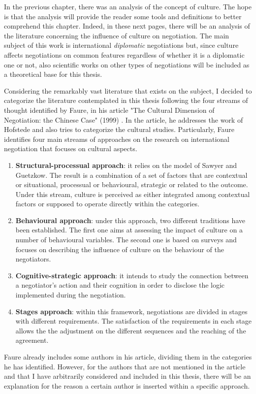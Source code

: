 \documentclass[../main.tex]{subfiles}
\begin{document}
In the previous chapter, there was an analysis of the concept of culture. The hope is that the analysis will provide the reader some tools and definitions to better comprehend this chapter. Indeed, in these next pages, there will be an analysis of the literature concerning the influence of culture on negotiation. The main subject of this work is international \textit{diplomatic} negotiations but, since culture affects negotiations on common features regardless of whether it is a diplomatic one or not, also scientific works on other types of negotiations will be included as a theoretical base for this thesis.%

Considering the remarkably vast literature that exists on the subject, I decided to categorize the literature contemplated %
in this thesis following the four streams of thought identified by Faure, in his article "The Cultural Dimension of Negotiation: the Chinese Case" (1999) \cite{faure}. In the article, he addresses the work of Hofstede and also tries to categorize the cultural studies. Particularly, Faure identifies four main streams of approaches on the research on international negotiation that focuses on cultural aspects.
\begin{enumerate}
\item \textbf{Structural-processual approach}: it relies on the model of Sawyer and Guetzkow. The result is a combination of a set of factors that are contextual or situational, processual or behavioural, strategic or related to the outcome. Under this stream, culture is perceived as either integrated among contextual factors or supposed to operate directly within the categories.
\item \textbf{Behavioural approach}: under this approach, two different traditions have been established. The first one aims at assessing the impact of culture on a number of behavioural variables. The second one is based on surveys and focuses on describing the influence of culture on the behaviour of the negotiators.
\item \textbf{Cognitive-strategic approach}: it intends to study the connection between a negotiator's action and their cognition in order to disclose the logic implemented during the negotiation.
\item \textbf{Stages approach}: within this framework, negotiations are divided in stages with different requirements. The satisfaction of the requirements in each stage allows the the adjustment on the different sequences and the reaching of the agreement.
\end{enumerate} %

Faure already includes some authors in his article, dividing them in the categories he has identified. However, for the authors that are not mentioned in the article and that I have arbitrarily considered and included in this thesis, there will be an explanation for the reason a certain author is inserted within a specific approach.
\end{document}
